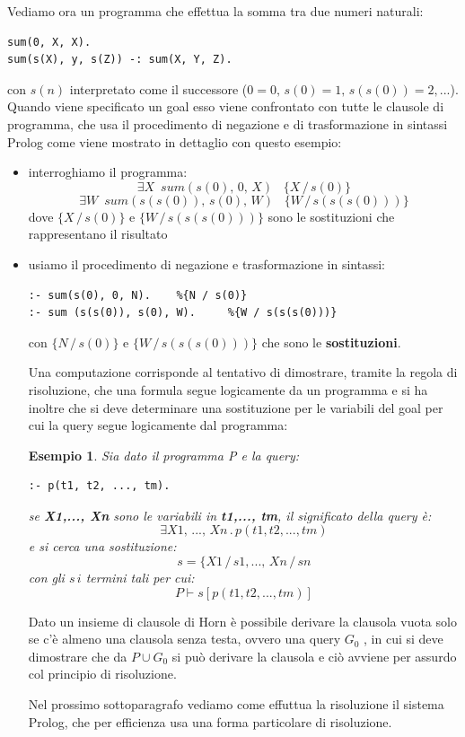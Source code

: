 \documentclass[a4paper]{report}
\newtheorem{esempio}{Esempio}
\begin{document}
Vediamo ora un programma che effettua la somma tra due numeri naturali:
\begin{verbatim}
sum(0, X, X).
sum(s(X), y, s(Z)) -: sum(X, Y, Z).
\end{verbatim}
con $s(n)$ interpretato come il successore ($0=0,\, s(0)=1, \,s(s(0))=2,... $).\newline
Quando viene specificato un goal esso viene confrontato con tutte le clausole di programma, che usa il procedimento di negazione
e di trasformazione in sintassi Prolog come viene mostrato in dettaglio con questo esempio:
\begin{itemize}
\item  interroghiamo il programma:
$$\exists X\,\,\, sum(s(0),\, 0,\, X)\,\,\,\,\,\{X\,/\, s(0)\}$$
$$\exists W\,\,\, sum(s(s(0)),\, s(0), \, W)\,\,\,\,\,\{W\,/\, s(s(s(0)))\}$$
dove $\{X\,/\, s(0)\}$ e $\{W\,/\, s(s(s(0)))\}$ sono le sostituzioni che rappresentano il risultato
\item usiamo il procedimento di negazione e trasformazione in sintassi:
\begin{verbatim}
:- sum(s(0), 0, N).    %{N / s(0)}
:- sum (s(s(0)), s(0), W).     %{W / s(s(s(0)))}
\end{verbatim}
con $\{N\, /\, s(0)\}$ e $\{W \,/\, s(s(s(0)))\}$ che sono le \textbf{sostituzioni}.

Una computazione corrisponde al tentativo di dimostrare, tramite la regola di risoluzione, che una formula segue logicamente da un programma
e si ha inoltre che si deve determinare una sostituzione per le variabili del goal per cui la query segue  logicamente dal programma:
\begin{esempio}
Sia dato il programma P e la query:
\begin{verbatim}
:- p(t1, t2, ..., tm).
\end{verbatim}
se \textbf{X1,..., Xn} sono le variabili in \textbf{t1,..., tm}, il significato della query è:
$$\exists X1,\,..., \,Xn\, . \,p(t1, t2, ..., tm)$$
e si cerca una sostituzione:
$$s=\{X1\,/\,s1,...,\, Xn\,/\,sn$$
con gli $s\,i$ termini tali per cui:
$$P\vdash s[p(t1, t2, ..., tm)]$$
\end{esempio}
Dato un insieme di clausole di Horn è possibile derivare la clausola vuota solo se c'è almeno una clausola senza testa, ovvero una query $G_0$
, in cui si deve dimostrare che da $P \cup G_0$ si può derivare la clausola e ciò avviene per assurdo col principio di risoluzione.

Nel prossimo sottoparagrafo vediamo come effuttua la risoluzione il sistema Prolog, che per efficienza usa una forma particolare di risoluzione.

\end{itemize}
\end{document}
